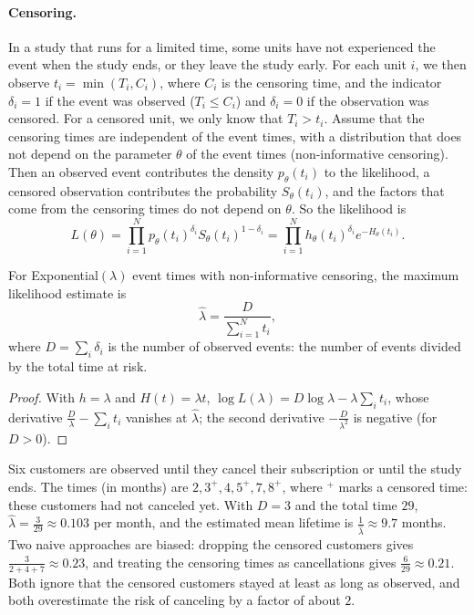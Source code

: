 \paragraph{Censoring.} In a study that runs for a limited time, some units have not experienced the event when the study ends, or they leave the study early. For each unit $i$, we then observe $t_i = \min(T_i, C_i)$, where $C_i$ is the censoring time, and the indicator $\delta_i = 1$ if the event was observed ($T_i \leq C_i$) and $\delta_i = 0$ if the observation was censored. For a censored unit, we only know that $T_i > t_i$. Assume that the censoring times are independent of the event times, with a distribution that does not depend on the parameter $\theta$ of the event times (non-informative censoring). Then an observed event contributes the density $p_\theta(t_i)$ to the likelihood, a censored observation contributes the probability $S_\theta(t_i)$, and the factors that come from the censoring times do not depend on $\theta$. So the likelihood is
\[L(\theta) = \prod_{i=1}^N p_\theta(t_i)^{\delta_i}S_\theta(t_i)^{1 - \delta_i} = \prod_{i=1}^N h_\theta(t_i)^{\delta_i}e^{-H_\theta(t_i)}.\]

\begin{proposition}\label{L4-prop:censored-mle}
    For Exponential$(\lambda)$ event times with non-informative censoring, the maximum likelihood estimate is
    \[\hat\lambda = \frac{D}{\sum_{i=1}^N t_i},\]
    where $D = \sum_i \delta_i$ is the number of observed events: the number of events divided by the total time at risk.
\end{proposition}

\begin{proof}
    With $h = \lambda$ and $H(t) = \lambda t$, $\log L(\lambda) = D\log\lambda - \lambda\sum_i t_i$, whose derivative $\frac{D}{\lambda} - \sum_i t_i$ vanishes at $\hat\lambda$; the second derivative $-\frac{D}{\lambda^2}$ is negative (for $D > 0$).
\end{proof}

\begin{example}\label{L4-ex:censored}
    Six customers are observed until they cancel their subscription or until the study ends. The times (in months) are $2, 3^+, 4, 5^+, 7, 8^+$, where $^+$ marks a censored time: these customers had not canceled yet. With $D = 3$ and the total time $29$, $\hat\lambda = \frac{3}{29} \approx 0.103$ per month, and the estimated mean lifetime is $\frac{1}{\hat\lambda} \approx 9.7$ months. Two naive approaches are biased: dropping the censored customers gives $\frac{3}{2 + 4 + 7} \approx 0.23$, and treating the censoring times as cancellations gives $\frac{6}{29} \approx 0.21$. Both ignore that the censored customers stayed at least as long as observed, and both overestimate the risk of canceling by a factor of about $2$.
\end{example}

